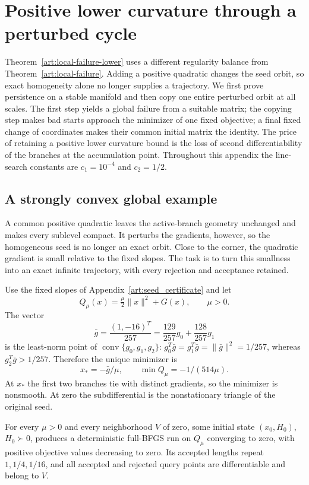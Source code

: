 \section{Positive lower curvature through a perturbed cycle}
\label{art:lower_curvature}

Theorem~\ref{art:local-failure-lower} uses a different regularity balance
from Theorem~\ref{art:local-failure}. Adding a positive quadratic changes
the seed orbit, so exact homogeneity alone no longer supplies a trajectory.
We first prove persistence on a stable manifold and then copy one entire
perturbed orbit at all scales. The first step yields a global failure
from a suitable matrix; the copying step makes bad starts approach the
minimizer of one fixed objective; a final fixed change of coordinates
makes their common initial matrix the identity. The price of retaining
a positive lower curvature bound is the loss of second differentiability
of the branches at the accumulation point. Throughout this appendix the
line-search constants are $c_1=10^{-4}$ and $c_2=1/2$.

\subsection{A strongly convex global example}
A common positive quadratic leaves the active-branch geometry unchanged
and makes every sublevel compact. It perturbs the gradients, however, so
the homogeneous seed is no longer an exact orbit. Close to the corner,
the quadratic gradient is small relative to the fixed slopes. The task
is to turn this smallness into an exact infinite trajectory, with every
rejection and acceptance retained.

Use the fixed slopes of Appendix~\ref{art:seed_certificate} and let
\[
 Q_\mu(x)=\tfrac\mu2\|x\|^2+G(x),\qquad\mu>0.
\]
The vector
\[
 \bar g=\frac{(1,-16)^T}{257}
        =\frac{129}{257}g_0+\frac{128}{257}g_1
\]
is the least-norm point of $\operatorname{conv}\{g_0,g_1,g_2\}$:
$g_0^T\bar g=g_1^T\bar g=\|\bar g\|^2=1/257$, whereas
$g_2^T\bar g>1/257$. Therefore the unique minimizer is
\begin{equation}\label{art:quadratic_minimizer}
 x_*=-\bar g/\mu,\qquad \min Q_\mu=-1/(514\mu).
\end{equation}
At $x_*$ the first two branches tie with distinct gradients, so the
minimizer is nonsmooth. At zero the subdifferential is the nonstationary
triangle of the original seed.

\begin{proposition}\label{art:quadratic_failure}
For every $\mu>0$ and every neighborhood $V$ of zero, some initial state
$(x_0,H_0)$, $H_0\succ0$, produces a deterministic full-BFGS run on
$Q_\mu$ converging to zero, with positive objective values decreasing to
zero. Its accepted lengths repeat $1,1/4,1/16$, and all accepted and
rejected query points are differentiable and belong to $V$.
\end{proposition}

